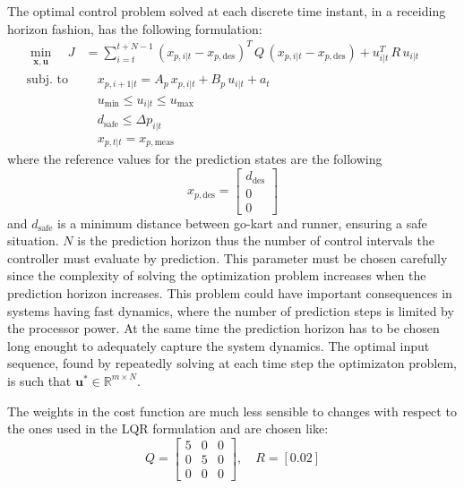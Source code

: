 \documentclass[a4paper,12pt,oneside]{book}
\begin{document}
\bigskip
The optimal control problem solved at each discrete time instant, in a receiding horizon fashion, has the following formulation:
\begin{equation}
\begin{alignedat}{2}
	\min_{\substack{\boldsymbol{x}, \boldsymbol{u}}}\quad J &= \sum_{i=t}^{t+N-1} (x_{p,i|t} - x_{p,\text{des}}) ^T \, Q \, (x_{p,i|t} - x_{p,\text{des}}) +  u_{i|t}^T \, R \, u_{i|t} &&   \\
	\text{subj. to} & \quad x_{p,i+1|t}  = A_p \, x_{p,i|t} + B_p \, u_{i|t} + a_t && \\
    &\quad u_{\text{min}} \leq u_{i|t} \leq u_{\text{max}}&& \\
    &\quad d_{\text{safe}}\leq \Delta p_{i|t} &&  \\
    &\quad x_{p,t|t} = x_{p,\text{meas}} &&
\end{alignedat}
\label{MPC_formulation}
\end{equation}
where the reference values for the prediction states are the following
\begin{equation}
    x_{p,\text{des}} =
    \begin{bmatrix}
        d_{\text{des}}  \\
        0 \\
        0
    \end{bmatrix}
\end{equation}
and $d_{\text{safe}}$ is a minimum distance between go-kart and runner, ensuring a safe situation.
$N$ is the prediction horizon thus the number of control intervals the controller must evaluate by prediction. 
This parameter must be chosen carefully since the complexity of solving the optimization problem increases when the prediction horizon increases. 
This problem could have important consequences in systems having fast dynamics, where the number of prediction steps is limited by the processor power.
At the same time the prediction horizon has to be chosen long enought to adequately capture the system dynamics.
The optimal input sequence, found by repeatedly solving at each time step the optimizaton problem, is such that $\boldsymbol{u}^* \in \mathbb{R}^{m \times N}$.

The weights in the cost function are much less sensible to changes with respect to the ones used in the LQR formulation and are chosen like:
\begin{equation}
    Q =
    \begin{bmatrix}
        5 & 0 & 0 \\
        0 & 5 & 0 \\
        0 & 0 & 0
    \end{bmatrix},
    \quad
    R = [0.02]    
\end{equation}
\end{document}
